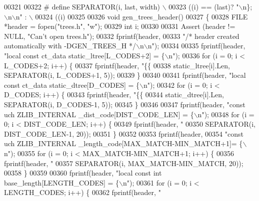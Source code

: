 \begin{DoxyCode}
{{00321 
00322 \textcolor{preprocessor}{#  define SEPARATOR(i, last, width) \(\backslash\)}
00323 \textcolor{preprocessor}{      ((i) == (last)? "\(\backslash\)n\};\(\backslash\)n\(\backslash\)n" :    \(\backslash\)}
00324 \textcolor{preprocessor}{       ((i) %
00325 
00326 \textcolor{keywordtype}{void} gen\_trees\_header()
00327 \{
00328     FILE *header = fopen(\textcolor{stringliteral}{"trees.h"}, \textcolor{stringliteral}{"w"});
00329     \textcolor{keywordtype}{int} i;
00330 
00331     Assert (header != NULL, \textcolor{stringliteral}{"Can't open trees.h"});
00332     fprintf(header,
00333             \textcolor{stringliteral}{"/* header created automatically with -DGEN\_TREES\_H */\(\backslash\)n\(\backslash\)n"});
00334 
00335     fprintf(header, \textcolor{stringliteral}{"local const ct\_data static\_ltree[L\_CODES+2] = \{\(\backslash\)n"});
00336     \textcolor{keywordflow}{for} (i = 0; i < L\_CODES+2; i++) \{
00337         fprintf(header, \textcolor{stringliteral}{"\{\{%
00338                 static\_ltree[i].Len, SEPARATOR(i, L\_CODES+1, 5));
00339     \}
00340 
00341     fprintf(header, \textcolor{stringliteral}{"local const ct\_data static\_dtree[D\_CODES] = \{\(\backslash\)n"});
00342     \textcolor{keywordflow}{for} (i = 0; i < D\_CODES; i++) \{
00343         fprintf(header, \textcolor{stringliteral}{"\{\{%
00344                 static\_dtree[i].Len, SEPARATOR(i, D\_CODES-1, 5));
00345     \}
00346 
00347     fprintf(header, \textcolor{stringliteral}{"const uch ZLIB\_INTERNAL \_dist\_code[DIST\_CODE\_LEN] = \{\(\backslash\)n"});
00348     \textcolor{keywordflow}{for} (i = 0; i < DIST\_CODE\_LEN; i++) \{
00349         fprintf(header, \textcolor{stringliteral}{"%
00350                 SEPARATOR(i, DIST\_CODE\_LEN-1, 20));
00351     \}
00352 
00353     fprintf(header,
00354         \textcolor{stringliteral}{"const uch ZLIB\_INTERNAL \_length\_code[MAX\_MATCH-MIN\_MATCH+1]= \{\(\backslash\)n"});
00355     \textcolor{keywordflow}{for} (i = 0; i < MAX\_MATCH-MIN\_MATCH+1; i++) \{
00356         fprintf(header, \textcolor{stringliteral}{"%
00357                 SEPARATOR(i, MAX\_MATCH-MIN\_MATCH, 20));
00358     \}
00359 
00360     fprintf(header, \textcolor{stringliteral}{"local const int base\_length[LENGTH\_CODES] = \{\(\backslash\)n"});
00361     \textcolor{keywordflow}{for} (i = 0; i < LENGTH\_CODES; i++) \{
00362         fprintf(header, \textcolor{stringliteral}{"%
}}}}}}}}
\end{DoxyCode}
